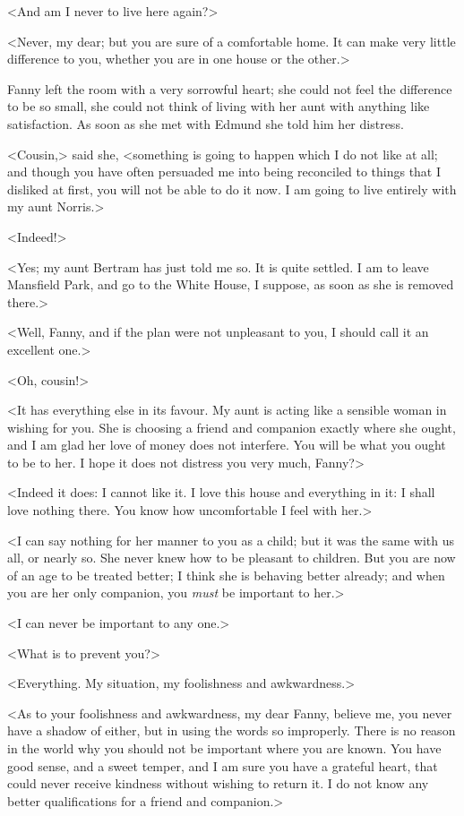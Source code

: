 <And am I never to live here again?>

<Never, my dear; but you are sure of a comfortable home. It can make very little difference to you, whether you are in one house or the other.>

Fanny left the room with a very sorrowful heart; she could not feel the difference to be so small, she could not think of living with her aunt with anything like satisfaction. As soon as she met with Edmund she told him her distress.

<Cousin,> said she, <something is going to happen which I do not like at all; and though you have often persuaded me into being reconciled to things that I disliked at first, you will not be able to do it now. I am going to live entirely with my aunt Norris.>

<Indeed!>

<Yes; my aunt Bertram has just told me so. It is quite settled. I am to leave Mansfield Park, and go to the White House, I suppose, as soon as she is removed there.>

<Well, Fanny, and if the plan were not unpleasant to you, I should call it an excellent one.>

<Oh, cousin!>

<It has everything else in its favour. My aunt is acting like a sensible woman in wishing for you. She is choosing a friend and companion exactly where she ought, and I am glad her love of money does not interfere. You will be what you ought to be to her. I hope it does not distress you very much, Fanny?>

<Indeed it does: I cannot like it. I love this house and everything in it: I shall love nothing there. You know how uncomfortable I feel with her.>

<I can say nothing for her manner to you as a child; but it was the same with us all, or nearly so. She never knew how to be pleasant to children. But you are now of an age to be treated better; I think she is behaving better already; and when you are her only companion, you \textit{must}  be important to her.>

<I can never be important to any one.>

<What is to prevent you?>

<Everything. My situation, my foolishness and awkwardness.>

<As to your foolishness and awkwardness, my dear Fanny, believe me, you never have a shadow of either, but in using the words so improperly. There is no reason in the world why you should not be important where you are known. You have good sense, and a sweet temper, and I am sure you have a grateful heart, that could never receive kindness without wishing to return it. I do not know any better qualifications for a friend and companion.>

